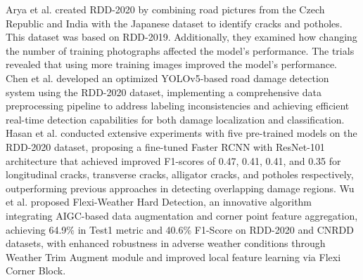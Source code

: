 \documentclass[sensors,article,submit,moreauthors]{Definitions/mdpi}
\begin{document}
    Arya et al.\citep{arya2021rdd2020} created RDD-2020 by combining road pictures from the Czech Republic and India with the Japanese dataset to identify cracks and potholes. This dataset was based on RDD-2019. Additionally, they examined how changing the number of training photographs affected the model's performance. The trials revealed that using more training images improved the model's performance.
    Chen et al.\citep{chen2023research} developed an optimized YOLOv5-based road damage detection system using the RDD-2020 dataset, implementing a comprehensive data preprocessing pipeline to address labeling inconsistencies and achieving efficient real-time detection capabilities for both damage localization and classification. Hasan et al.\citep{hasan2022road} conducted extensive experiments with five pre-trained models on the RDD-2020 dataset, proposing a fine-tuned Faster RCNN with ResNet-101 architecture that achieved improved F1-scores of 0.47, 0.41, 0.41, and 0.35 for longitudinal cracks, transverse cracks, alligator cracks, and potholes respectively, outperforming previous approaches in detecting overlapping damage regions. Wu et al.\citep{wu2024utilize} proposed Flexi-Weather Hard Detection, an innovative algorithm integrating AIGC-based data augmentation and corner point feature aggregation, achieving 64.9\% in Test1 metric and 40.6\% F1-Score on RDD-2020 and CNRDD datasets, with enhanced robustness in adverse weather conditions through Weather Trim Augment module and improved local feature learning via Flexi Corner Block.
\end{document}
